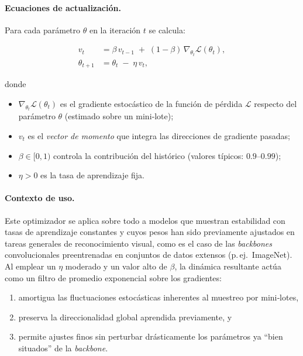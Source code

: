 \paragraph{Ecuaciones de actualización.}
Para cada parámetro \(\theta\) en la iteración \(t\) se calcula:

\[
\begin{aligned}
v_t        &= \beta\, v_{t-1} \;+\; (1 - \beta)\,\nabla_{\theta_t}\mathcal{L}(\theta_t), \\
\theta_{t+1} &= \theta_t \;-\; \eta\, v_t ,
\end{aligned}
\]

donde
\begin{itemize}
  \item \(\nabla_{\theta_t}\mathcal{L}(\theta_t)\) es el gradiente estocástico de la función de pérdida \(\mathcal{L}\) respecto del parámetro \(\theta\) (estimado sobre un mini‐lote);
  \item \(v_t\) es el \emph{vector de momento} que integra las direcciones de gradiente pasadas;
  \item \(\beta\in[0,1)\) controla la contribución del histórico (valores típicos: \(0.9\)–\(0.99\));
  \item \(\eta>0\) es la tasa de aprendizaje fija.
\end{itemize}

\paragraph{Contexto de uso.}
Este optimizador se aplica sobre todo a modelos que muestran estabilidad con tasas de aprendizaje constantes y cuyos pesos han sido previamente ajustados en tareas generales de reconocimiento visual, como es el caso de las \emph{backbones} convolucionales preentrenadas en conjuntos de datos extensos (p.\,ej.\ ImageNet).
Al emplear un \(\eta\) moderado y un valor alto de \(\beta\), la dinámica resultante actúa como un filtro de promedio exponencial sobre los gradientes:
\renewcommand\labelenumi{(\alph{enumi})}
\begin{enumerate}
  \item amortigua las fluctuaciones estocásticas inherentes al muestreo por mini‐lotes,
  \item preserva la direccionalidad global aprendida previamente, y
  \item permite ajustes finos sin perturbar drásticamente los parámetros ya “bien situados” de la \emph{backbone}.
\end{enumerate}

